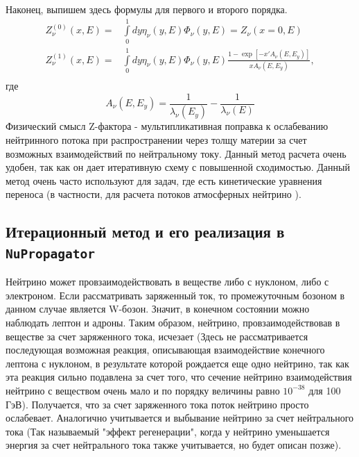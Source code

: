 Наконец, выпишем здесь формулы для первого и второго порядка. 
\begin{equation}
    \begin{aligned}
      Z^{(0)}_{\nu}(x,E) =  &\int\limits_0^1dy\eta_{\nu}(y,E)\Phi_{\nu}(y,E)  = Z_{\nu}(x = 0,E)\\
       Z^{(1)}_{\nu}(x,E) = &\int\limits_0^1dy\eta_{\nu}(y,E)\Phi_{\nu}(y,E)\frac{1 - \exp\left[ -x'A_{\nu}(E,E_y) \right]}{xA_{\nu}(E,E_y)},\\
    \end{aligned}
\end{equation}
где 
\begin{equation}
    A_{\nu}(E,E_y) = \frac{1}{\lambda_{\nu}(E_y)} - \frac{1}{\lambda_{\nu}(E)}
\end{equation}
Физический смысл Z-фактора  - мультипликативная поправка к ослабеванию нейтринного потока при распространении через толщу материи за счет возможных взаимодействий по нейтральному току. Данный метод расчета очень удобен, так как он дает итеративную схему с повышенной сходимостью. Данный метод очень часто используют для задач, где есть кинетические уравнения переноса (в частности, для расчета потоков атмосферных нейтрино \cite{sinegovskaya2015}).
\subsection{Итерационный метод и его реализация в \texttt{NuPropagator}}
Нейтрино может провзаимодействовать в веществе либо с нуклоном, либо с электроном. Если рассматривать заряженный ток, то промежуточным бозоном в данном случае является W-бозон. Значит, в конечном состоянии можно наблюдать лептон и адроны. 
Таким образом, нейтрино, провзаимодействовав в веществе за счет заряженного тока, исчезает (Здесь не рассматривается последующая возможная реакция, описывающая  взаимодействие конечного лептона с нуклоном, в результате которой рождается еще одно нейтрино, так как эта реакция сильно подавлена за счет того, что сечение нейтрино взаимодействия нейтрино с веществом очень мало и по порядку величины равно $10^{-38}$ для 100 ГэВ).
Получается, что за счет заряженного тока поток нейтрино просто ослабевает. Аналогично учитывается и выбывание нейтрино за счет нейтрального тока (Так называемый "эффект регенерации", когда у нейтрино уменьшается энергия за счет нейтрального тока также учитывается, но будет описан позже). 

